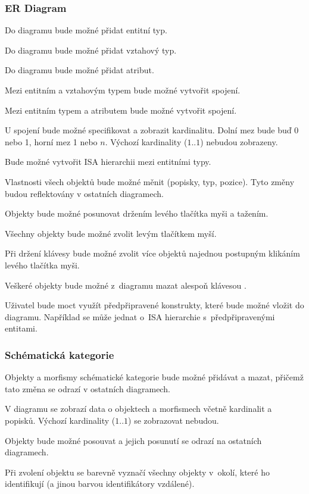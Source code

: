 \subsubsection*{ER Diagram}
\begin{enumfp}[resume]
  \item Do diagramu bude možné přidat entitní typ.
  \item Do diagramu bude možné přidat vztahový typ.
  \item Do diagramu bude možné přidat atribut.
  \item Mezi entitním a vztahovým typem bude možné vytvořit spojení.
  \item Mezi entitním typem a atributem bude možné vytvořit spojení.
  \item U spojení bude možné specifikovat a zobrazit kardinalitu.
  Dolní mez bude buď 0 nebo 1, horní mez 1 nebo $n$.
  Výchozí kardinality ($1..1$) nebudou zobrazeny.
  \item Bude možné vytvořit ISA hierarchii mezi entitními typy.
  \item Vlastnosti všech objektů bude možné měnit (popisky, typ, pozice).
  Tyto změny budou reflektovány v ostatních diagramech.
  \item Objekty bude možné posunovat držením levého tlačítka myši a tažením.
  \item Všechny objekty bude možné zvolit levým tlačítkem myší.
  \item Při držení klávesy \keys{\ctrl} bude možné zvolit více objektů najednou postupným klikáním levého tlačítka myši.
  \item Veškeré objekty bude možné z~diagramu mazat alespoň klávesou .
  \item Uživatel bude moct využít předpřipravené konstrukty, které bude možné vložit do diagramu.
  Například se může jednat o~ISA hierarchie s~předpřipravenými entitami.
\end{enumfp}

\subsubsection*{Schématická kategorie}
\begin{enumfp}[resume]
  \item Objekty a morfismy schématické kategorie bude možné přidávat a mazat, přičemž tato změna se odrazí v ostatních diagramech.
  \item V diagramu se zobrazí data o objektech a morfismech včetně kardinalit a popisků.
  Výchozí kardinality ($1..1$) se zobrazovat nebudou.
  \item Objekty bude možné posouvat a jejich posunutí se odrazí na ostatních diagramech.
  \item Při zvolení objektu se barevně vyznačí všechny objekty v~okolí, které ho identifikují (a jinou barvou identifikátory vzdálené).
\end{enumfp}

